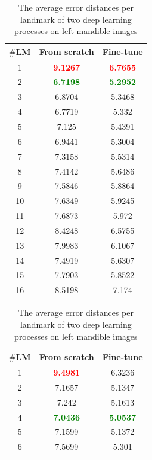 \documentclass[review]{elsarticle}
\begin{document}
\begin{table}[htbp]
\begin{minipage}[t]{0.45\textwidth}
\centering
\begin{tabular}{|c|c|c|}
		\hline
		\textbf{$\#$LM} & \textbf{From scratch} & \textbf{Fine-tune} \\ \hline
		1 & \textcolor{red}{\textbf{9.1267}} & \textcolor{red}{\textbf{6.7655}} \\ \hline
		2 & \textcolor{green}{\textbf{6.7198}} & \textcolor{green}{\textbf{5.2952}} \\ \hline
		3 & 6.8704 & 5.3468 \\ \hline
		4 & 6.7719 & 5.332 \\ \hline
		5 & 7.125 & 5.4391 \\ \hline
		6 & 6.9441 & 5.3004 \\ \hline
		7 & 7.3158 & 5.5314 \\ \hline
		8 & 7.4142 & 5.6486 \\ \hline
		9 & 7.5846 & 5.8864 \\ \hline
		10 & 7.6349 & 5.9245 \\ \hline
		11 & 7.6873 & 5.972 \\ \hline
		12 & 8.4248 & 6.5755 \\ \hline
		13 & 7.9983 & 6.1067 \\ \hline
		14 & 7.4919 & 5.6307 \\ \hline
		15 & 7.7903 & 5.8522 \\ \hline
		16 & 8.5198 & 7.174 \\ \hline
	\end{tabular}
\caption{The average error distances per landmark of two deep learning processes on left mandible images}
\label{tblcmpmg}
\end{minipage}
\hfill
\begin{minipage}[t]{0.45\textwidth}
\centering
\begin{tabular}{|c|c|c|}
\hline
\textbf{$\#$LM} & \textbf{From scratch} & \textbf{Fine-tune} \\ \hline
		1 & \textcolor{red}{\textbf{9.4981}} & 6.3236 \\ \hline
	2 & 7.1657 & 5.1347 \\ \hline
	3 & 7.242 & 5.1613 \\ \hline
	4 & \textcolor{green}{\textbf{7.0436}} & \textcolor{green}{\textbf{5.0537}} \\ \hline
	5 & 7.1599 & 5.1372 \\ \hline
	6 & 7.5699 & 5.301 \\ \hline

\end{tabular}
\end{minipage}
\end{table}
\end{document}
